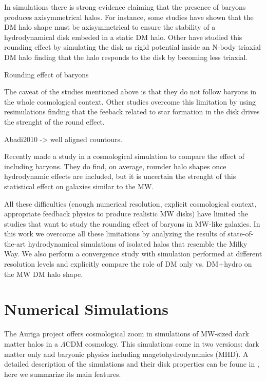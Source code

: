 \documentclass[a4paper,fleqn,usenatbib]{mnras}
\begin{document}
In simulations there is strong evidence claiming that the presence of
baryons produces axisymmetrical halos.  
For instance, some studies have shown that the DM halo shape must be
axisymmetrical to ensure the stability of a hydrodynamical disk
embeded in a static DM halo. 
Other have studied this rounding effect by simulating the disk as rigid
potential inside an N-body triaxial DM
halo \cite{Debattista_et_al._2008,Debattista_et_al._2013,Kazantzidis_et_al._2010}
finding that the halo responds to the disk by becoming less triaxial. 

Rounding effect of baryons
\citep{Dubinski94}

The caveat of the studies mentioned above is that they do not
follow baryons in the whole cosmological context. 
Other studies overcome this limitation by using resimulations 
\citep{Abadi_et_al._2010,Bryan_et_al._2013} finding that the
feeback related to star formation in the disk drives the strenght of
the round effect. 

Abadi2010 -> well aligned countours.

Recently \cite{2018arXiv180907255C} made a study in a cosmological
simulation to compare the effect of including baryons. They do find,
on average, rounder halo shapes once hydrodynamic effects are
included, but it is uncertain the strenght of this statistical effect
on galaxies similar to the MW.


\citep{Pedrosa10}


All these difficulties (enough numerical resolution, explicit
cosmological context, appropriate feedback physics to produce
realistic MW disks) have limited the studies that want to study the
rounding effect of baryons in MW-like galaxies.
In this work we overcome all these limitations by analyzing the
results of state-of-the-art hydrodynamical simulations of isolated
halos that resemble the Milky Way.
We also perform a convergence study with simulation performed at
different resolution levels and explicitly compare the role of DM only
vs. DM+hydro on the MW DM halo shape.


\section{Numerical Simulations}


The Auriga project offers cosmological zoom in simulations of MW-sized 
dark matter halos in a $\Lambda$CDM cosmology. 
This simulations come in two versions: dark matter only and
baryonic physics including magetohydrodynamics (MHD).
A detailed description of the simulations and their
disk properties can be founc in \citep{auriga}, here we summarize its
main features.
\end{document}

